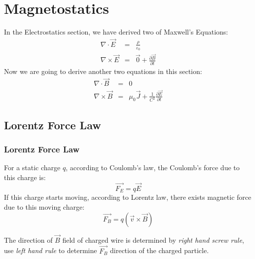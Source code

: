 \documentclass[12pt,a4paper,twoside]{article}
\numberwithin{equation}{section}
\begin{document}
\section{Magnetostatics}
    In the Electrostatics section, we have derived two of Maxwell's Equations:
    \begin{eqnarray*}
        \nabla \cdot \overrightarrow{E} &=& \frac{\rho}{\varepsilon_0}\\
        \nabla \times \overrightarrow{E} &=& \overrightarrow{0} +\frac{\partial\overrightarrow{B}}{\partial t}
    \end{eqnarray*}
    Now we are going to derive another two equations in this section:
    \begin{eqnarray*}
        \nabla \cdot \overrightarrow{B} &=& 0\\
        \nabla\times \overrightarrow{B} &=& \mu_0\overrightarrow{J}+\frac{1}{C^2}\frac{\partial\overrightarrow{E}}{\partial t}
    \end{eqnarray*}
    
\subsection{Lorentz Force Law}
\subsubsection{Lorentz Force Law}
    For a static charge $q$, according to Coulomb's law, the Coulomb's force due to this charge is:
    \[\overrightarrow{F_E}=q\overrightarrow{E}\]
    If this charge starts moving, according to Lorentz law, there exists magnetic force due to this moving charge:
    \begin{equation}
        \boxed{\overrightarrow{F_B}=q(\overrightarrow{v}\times\overrightarrow{B})}
        \label{eq:Lorentz Force}
    \end{equation}
    
    \noindent The direction of $\overrightarrow{B}$ field of charged wire is determined by \textit{right hand screw rule}, use \textit{left hand rule} to determine $\overrightarrow{F_B}$ direction of the charged particle.
    
\end{document}
